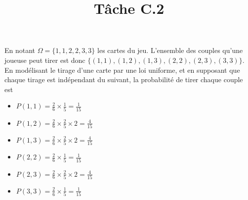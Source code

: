 \documentclass{article}
\title{Tâche C.2}
\date{}  %
\author{}  %
\begin{document}
\maketitle

En notant $\Omega = \{1, 1, 2, 2, 3, 3\}$ les cartes du jeu. L'ensemble des couples qu'une joueuse peut tirer est donc $\{(1,1), (1,2), (1,3), (2,2), (2,3), (3,3)\}$. En modélisant le tirage d’une carte par une loi uniforme, et en supposant que chaque tirage est indépendant du suivant, la probabilité de tirer chaque couple est

\begin{itemize}
    \item $P(1,1) = \frac{2}{6} \times \frac{1}{5} = \frac{1}{15}$
    \item $P(1,2) = \frac{2}{6} \times \frac{2}{5} \times 2 = \frac{4}{15}$
    \item $P(1,3) = \frac{2}{6} \times \frac{2}{5} \times 2 = \frac{4}{15}$
    \item $P(2,2) = \frac{2}{6} \times \frac{1}{5} = \frac{1}{15}$
    \item $P(2,3) = \frac{2}{6} \times \frac{2}{5} \times 2 = \frac{4}{15}$
    \item $P(3,3) = \frac{2}{6} \times \frac{1}{5} = \frac{1}{15}$
\end{itemize}
\end{document}
